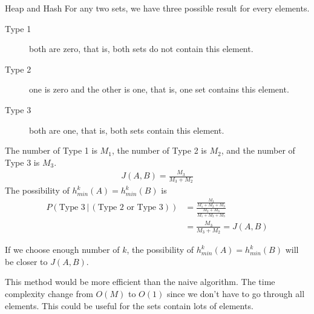 \begin{homeworkProblem}{Heap and Hash}
        For any two sets, we have three possible result for every elements.
        \begin{description}
            \item[Type 1] both are zero, that is, both sets do not contain this element.
            \item[Type 2] one is zero and the other is one, that is, one set
                contains this element.
            \item[Type 3] both are one, that is, both sets contain this element.
        \end{description}
        The number of Type 1 is $M_1$, the number of Type 2 is $M_2$, and
        the number of Type 3 is $M_3$. 
        \begin{align*}
        J(A,B) = \frac{M_3}{M_3 + M_2}
        \end{align*}
        The possibility of $h^k_{min}(A) = h^k_{min}(B)$ is 
        \begin{align*}
            P(\text{Type 3} \,|\, (\text{Type 2 or Type 3})) &= \frac{\frac{M_3}{M_1 + M_2 + M_3}}{\frac{M_2 + M_3}{M_1 + M_2 + M_3}} \\
            &= \frac{M_3}{M_3 + M_2} = J(A,B)
        \end{align*}

        If we choose enough number of $k$, the possibility of 
        $h^k_{min}(A) = h^k_{min}(B)$ will be closer to $J(A,B)$.

        This method would be more efficient than the naive algorithm. The time 
        complexity change from $O(M)$ to $O(1)$ since we don't have to go through
        all elements. This could be useful for the sets contain lots of elements.



\end{homeworkProblem}
